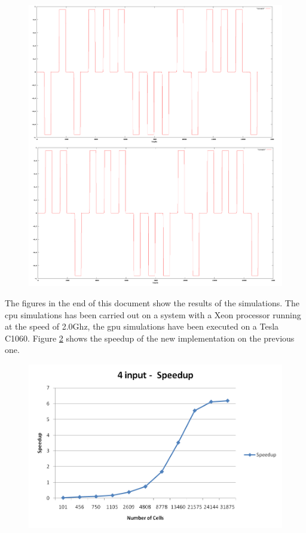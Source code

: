 \begin{figure} [h!]
\centering
\includegraphics[scale=0.2]{img/result.png}
\label{img:result}
\end{figure}

The figures in the end of this document show the results of the simulations. The cpu simulations has been carried out on a system with a Xeon processor running at the speed of 2.0Ghz, the gpu simulations have been executed on a Tesla C1060. Figure \ref{img:speed} shows the speedup of the new implementation on the previous one. 

\begin{figure}
\centering
\includegraphics[scale=0.6]{img/speed.png}
\label{img:speed}
\end{figure}

